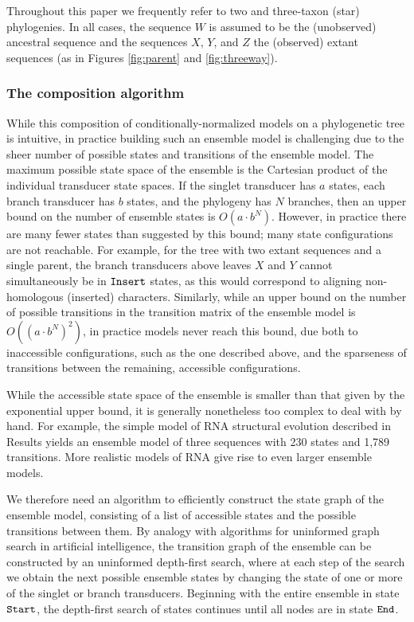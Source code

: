 \documentclass[10pt]{article}
\begin{document}
Throughout this paper we frequently refer to two and
three-taxon (star) phylogenies.  In all cases, the sequence $W$ is
assumed to be the (unobserved) ancestral sequence and the sequences
$X$, $Y$, and $Z$ the (observed) extant sequences (as in Figures
\ref{fig:parent} and \ref{fig:threeway}).




\subsubsection*{The composition algorithm}

While this composition of conditionally-normalized models on a
phylogenetic tree is intuitive, in practice building such an ensemble
model is challenging due to the sheer number of possible states and
transitions of the ensemble model.
The maximum possible state space of the ensemble is the Cartesian product of the
individual transducer state spaces. If the singlet transducer has $a$
states, each branch transducer has $b$ states, and the phylogeny has $N$
branches, then an upper bound on the number of
ensemble states is $O(a \cdot b^N)$.
However, in practice there are many fewer states than suggested by
this bound; many state configurations are not reachable.  For example,
for the tree with two extant sequences and a single parent,
the branch transducers above leaves $X$ and $Y$ cannot simultaneously
be in $\mathtt{Insert}$ states, as this would correspond to aligning
non-homologous (inserted) characters.
Similarly, while an upper bound on the number of possible transitions
in the transition matrix of the ensemble model is $O((a \cdot b^N)^2)$,
in practice models never reach this bound,
due both to inaccessible configurations, such as the one described above,
and the sparseness of transitions between the remaining, accessible configurations.

While the accessible state space of the ensemble is smaller than that
given by the exponential upper bound, it is generally nonetheless too
complex to deal with by hand.
For example, the simple model of RNA structural evolution described in
Results yields an ensemble model of three sequences with 230 states
and 1,789 transitions.  More realistic models of RNA give rise to even
larger ensemble models.

We therefore need an algorithm to efficiently construct the state graph of the
ensemble model, consisting of a list of accessible states and the
possible transitions between them. 
By analogy with algorithms for uninformed graph search in artificial
intelligence, the transition graph of the ensemble can be constructed
by an uninformed depth-first search, where at each step of the search
we obtain the next possible ensemble states by changing the state of one or
more of the singlet or branch transducers. Beginning with the entire
ensemble in state $\mathtt{Start}$, the depth-first search of states
continues until all nodes are in state $\mathtt{End}$.
\end{document}
